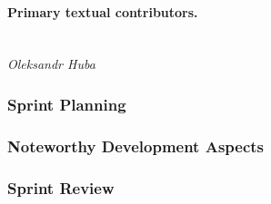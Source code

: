 \paragraph{Primary textual contributors.}
\mbox{}\\\emph{Oleksandr Huba}

\subsubsection{Sprint Planning}


\subsubsection{Noteworthy Development Aspects}


\subsubsection{Sprint Review}

